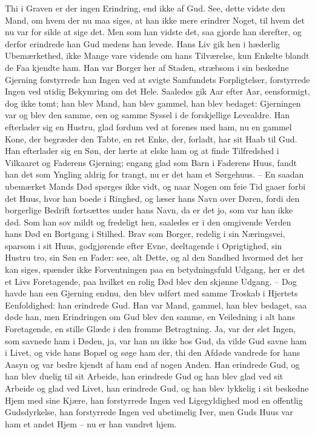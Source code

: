 \documentclass[12pt,a4paper]{article}
\begin{document}
Thi i Graven er der ingen Erindring, end ikke af Gud. See, dette vidste den Mand, om hvem der nu maa siges, at han ikke mere erindrer Noget, til hvem det nu var for silde at sige det. Men som han vidste det, saa gjorde han derefter, og derfor erindrede han Gud medens han levede. Hans Liv gik hen i hæderlig Ubemærkethed, ikke Mange vare vidende om hans Tilværelse, kun Enkelte blandt de Faa kjendte ham. Han var Borger her af Staden, stræbsom i sin beskedne Gjerning forstyrrede han Ingen ved at svigte Samfundets Forpligtelser, forstyrrede Ingen ved utidig Bekymring om det Hele. Saaledes gik Aar efter Aar, eensformigt, dog ikke tomt; han blev Mand, han blev gammel, han blev bedaget: Gjerningen var og blev den samme, een og samme Syssel i de forskjellige Levealdre. Han efterlader sig en Hustru, glad fordum ved at forenes med ham, nu en gammel Kone, der begræder den Tabte, en ret Enke, der, forladt, har sit Haab til Gud. Han efterlader sig en Søn, der lærte at elske ham og at finde Tilfredshed i Vilkaaret og Faderens Gjerning; engang glad som Barn i Faderens Huus, fandt han det som Yngling aldrig for trangt, nu er det ham et Sørgehuus. – En saadan ubemærket Mands Død spørges ikke vidt, og naar Nogen om føie Tid gaaer forbi det Huus, hvor han boede i Ringhed, og læser hans Navn over Døren, fordi den borgerlige Bedrift fortsættes under hans Navn, da er det jo, som var han ikke død. Som han sov mildt og fredeligt hen, saaledes er i den omgivende Verden hans Død en Bortgang i Stilhed. Brav som Borger, redelig i sin Næringsvei, sparsom i sit Huus, godgjørende efter Evne, deeltagende i Oprigtighed, sin Hustru tro, sin Søn en Fader: see, alt Dette, og al den Sandhed hvormed det her kan siges, spænder ikke Forventningen paa en betydningsfuld Udgang, her er det et Livs Foretagende, paa hvilket en rolig Død blev den skjønne Udgang. – Dog havde han een Gjerning endnu, den blev udført med samme Troskab i Hjertets Eenfoldighed: han erindrede Gud. Han var Mand, gammel, han blev bedaget, saa døde han, men Erindringen om Gud blev den samme, en Veiledning i alt hans Foretagende, en stille Glæde i den fromme Betragtning. Ja, var der slet Ingen, som savnede ham i Døden, ja, var han nu ikke hos Gud, da vilde Gud savne ham i Livet, og vide hans Bopæl og søge ham der, thi den Afdøde vandrede for hans Aasyn og var bedre kjendt af ham end af nogen Anden. Han erindrede Gud, og han blev duelig til sit Arbeide, han erindrede Gud og han blev glad ved sit Arbeide og glad ved Livet, han erindrede Gud, og han blev lykkelig i sit beskedne Hjem med sine Kjære, han forstyrrede Ingen ved Ligegyldighed mod en offentlig Gudsdyrkelse, han forstyrrede Ingen ved ubetimelig Iver, men Guds Huus var ham et andet Hjem – nu er han vandret hjem.
\end{document}
